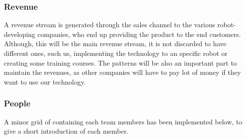 \subsubsection{Revenue}
A revenue stream is generated through the sales channel to the various robot-developing companies, who end up providing the product to the end customers. Although, this will be the main revenue stream, it is not discarded to have different ones, such us, implementing the technology to an specific robot or creating some training courses. The patterns will be also an important part to maintain the revenues, as other companies will have to pay lot of money if they want to use our technology.

\subsubsection{People}
A minor grid of containing each team members has been implemented below, to give a short introduction of each member.

